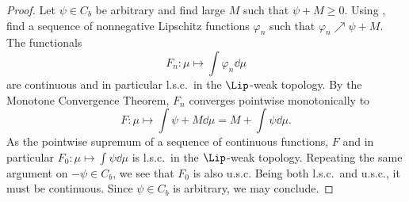 \documentclass[oneside,reqno,letterpaper]{amsart}
\begin{document}
\begin{proof}
  Let \(\psi \in C_b\) be arbitrary and find large \(M\) such that \(\psi + M \geq 0\).
  Using , find a sequence of nonnegative Lipschitz functions \(\varphi_n\) such that \(\varphi_n \nearrow \psi + M\).
  The functionals
  \[
    F_n: \mu \longmapsto \int \varphi_n \dd \mu
  \]
  are continuous and in particular l.s.c.\ in the \(\Lip\)-weak topology.
  By the Monotone Convergence Theorem, \(F_n\) converges pointwise monotonically to
  \[
    F: \mu \longmapsto \int \psi + M \dd \mu = M + \int \psi \dd \mu.
  \]
  As the pointwise supremum of a sequence of continuous functions, \(F\) and in particular \(F_0: \mu \mapsto  \int \psi \dd \mu\) is l.s.c.\ in the \(\Lip\)-weak topology.
  Repeating the same argument on \(-\psi \in C_b\), we see that \(F_0\) is also u.s.c.
  Being both l.s.c.\ and u.s.c., it must be continuous.
  Since \(\psi \in C_b\) is arbitrary, we may conclude.
\end{proof}
\end{document}
